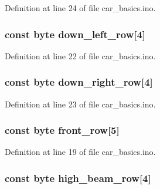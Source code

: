 Definition at line 24 of file car\+\_\+basics.\+ino.

\subsubsection[{\texorpdfstring{down\+\_\+left\+\_\+row}{down_left_row}}]{\setlength{\rightskip}{0pt plus 5cm}const byte down\+\_\+left\+\_\+row\mbox{[}4\mbox{]}}\hypertarget{group__deployment_gac8900a0d9fa4f35f99c82be1db05199d}{}\label{group__deployment_gac8900a0d9fa4f35f99c82be1db05199d}


Definition at line 22 of file car\+\_\+basics.\+ino.

\subsubsection[{\texorpdfstring{down\+\_\+right\+\_\+row}{down_right_row}}]{\setlength{\rightskip}{0pt plus 5cm}const byte down\+\_\+right\+\_\+row\mbox{[}4\mbox{]}}\hypertarget{group__deployment_gac32ac62cf68805d76bf34bdd3c83fb0c}{}\label{group__deployment_gac32ac62cf68805d76bf34bdd3c83fb0c}


Definition at line 23 of file car\+\_\+basics.\+ino.

\subsubsection[{\texorpdfstring{front\+\_\+row}{front_row}}]{\setlength{\rightskip}{0pt plus 5cm}const byte front\+\_\+row\mbox{[}5\mbox{]}}\hypertarget{group__deployment_ga848556a6e145736d917b4f0a67ee60ae}{}\label{group__deployment_ga848556a6e145736d917b4f0a67ee60ae}


Definition at line 19 of file car\+\_\+basics.\+ino.

\subsubsection[{\texorpdfstring{high\+\_\+beam\+\_\+row}{high_beam_row}}]{\setlength{\rightskip}{0pt plus 5cm}const byte high\+\_\+beam\+\_\+row\mbox{[}4\mbox{]}}\hypertarget{group__deployment_ga8b165874b487053cb404215a7f42e33e}{}\label{group__deployment_ga8b165874b487053cb404215a7f42e33e}


